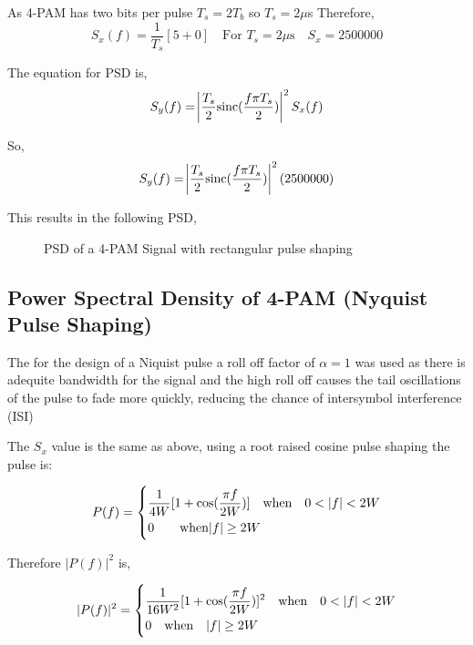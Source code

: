 As 4-PAM has two bits per pulse $T_s = 2 T_b$ so $T_s = 2 \mu$s Therefore,
\begin{equation}
    \label{eqn:sx-real}
    S_x(f) = \frac{1}{T_s} [5 + 0] \quad \textrm{For $T_s = 2\mu$s} \quad S_x=2500000
\end{equation}

The equation for PSD is,
\begin{equation}
    \label{eqn:PSD-4-PAM-rect}
    S_y(f) = \abs{\frac{T_s}{2} \textrm{sinc}( \frac{f \pi T_s}{2} )}^2 S_x(f)
\end{equation}

So,
\begin{equation}
    \label{eqn:sy-value}
    S_y(f) = \abs{\frac{T_s}{2} \textrm{sinc}({\frac{f \pi T_s}{2}})}^2 (2500000)
\end{equation}
    
This results in the following PSD,
\begin{figure}[h]
    \begin{center}
        
        \caption{PSD of a 4-PAM Signal with rectangular pulse shaping}
    \end{center}
\end{figure}

\subsection{Power Spectral Density of 4-PAM (Nyquist Pulse Shaping)}
The for the design of a Niquist pulse a roll off factor of $\alpha = 1$ was used as there is adequite bandwidth
for the signal and the high roll off causes the tail oscillations of the pulse to fade more quickly, reducing the
chance of intersymbol interference (ISI)

The $S_x$ value is the same as above, using a root raised cosine pulse shaping the pulse is:

\begin{equation}
    \label{eqn:pf-w-niquist}
    P(f) =
    \begin{dcases}
        \frac{1}{4W} [1+\textrm{cos}(\frac{\pi f}{2W})] \quad \textrm{when} \quad 0<|f|<2W \\
        0 \quad \quad \textrm{when} |f| \geq 2W
    \end{dcases}
\end{equation}

Therefore $|P(f)|^2$ is,

\begin{equation}
    \label{eqn-pf2-nyquist}
    |P(f)|^2 =
    \begin{dcases}
        \frac{1}{16W^2}[1+\textrm{cos}(\frac{\pi f}{2W})]^2 \quad \textrm{when} \quad 0<|f|<2W \\
        0 \quad \textrm{when} \quad |f| \geq 2W
    \end{dcases}
\end{equation}

